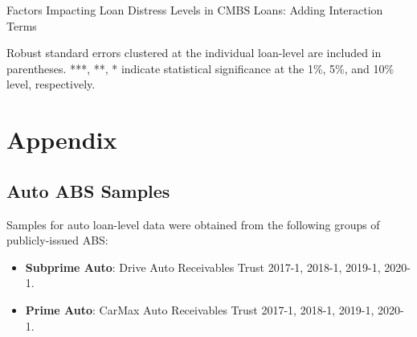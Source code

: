 \documentclass[10.5pt]{article}
\begin{document}
\begin{table}[H]
    \begin{center}
  \caption{Factors Impacting Loan Distress Levels in CMBS Loans: Adding Interaction Terms}
    {\renewcommand\normalsize{\small}%
    \footnotesize
    }
    \end{center}
\end{table}
\noindent\footnotesize{Robust standard errors clustered at the individual loan-level are included in parentheses. ***, **, * indicate statistical significance at the 1\%, 5\%, and 10\% level, respectively.}
\newpage




\section{Appendix}
\subsection{Auto ABS Samples}
Samples for auto loan-level data were obtained from the following groups of publicly-issued ABS:
\begin{itemize} [label=$-$, leftmargin=*]
    \item \textbf{Subprime Auto}: Drive Auto Receivables Trust 2017-1, 2018-1, 2019-1, 2020-1.
    \item \textbf{Prime Auto}: CarMax Auto Receivables Trust 2017-1, 2018-1, 2019-1, 2020-1.
\end{itemize}
\end{document}
